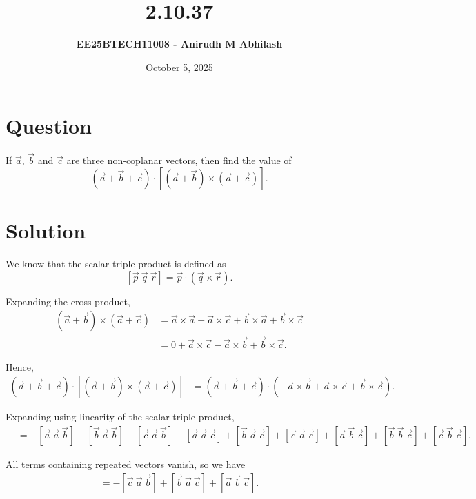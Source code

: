 \documentclass[12pt]{article}
\title{\textbf{2.10.37}}
\author{\textbf{EE25BTECH11008 - Anirudh M Abhilash}}
\date{October 5, 2025}
\begin{document}
\maketitle

\section*{Question}

If $\vec{a}$, $\vec{b}$ and $\vec{c}$ are three non-coplanar vectors, then find the value of  
\[
(\vec{a} + \vec{b} + \vec{c}) \cdot [(\vec{a} + \vec{b}) \times (\vec{a} + \vec{c})].
\]

\section*{Solution}

We know that the scalar triple product is defined as  
\[
[\vec{p}\ \vec{q}\ \vec{r}] = \vec{p} \cdot (\vec{q} \times \vec{r}).
\]

Expanding the cross product,
\begin{align}
(\vec{a} + \vec{b}) \times (\vec{a} + \vec{c})
&= \vec{a} \times \vec{a} + \vec{a} \times \vec{c} + \vec{b} \times \vec{a} + \vec{b} \times \vec{c} \\[4pt]
&= 0 + \vec{a} \times \vec{c} - \vec{a} \times \vec{b} + \vec{b} \times \vec{c}.
\end{align}

Hence,
\begin{align}
(\vec{a} + \vec{b} + \vec{c}) \cdot [(\vec{a} + \vec{b}) \times (\vec{a} + \vec{c})]
&= (\vec{a} + \vec{b} + \vec{c}) \cdot \left(-\vec{a} \times \vec{b} + \vec{a} \times \vec{c} + \vec{b} \times \vec{c}\right).
\end{align}

Expanding using linearity of the scalar triple product,
\begin{align}
&= -[\vec{a}\ \vec{a}\ \vec{b}] - [\vec{b}\ \vec{a}\ \vec{b}] - [\vec{c}\ \vec{a}\ \vec{b}]
+ [\vec{a}\ \vec{a}\ \vec{c}] + [\vec{b}\ \vec{a}\ \vec{c}] + [\vec{c}\ \vec{a}\ \vec{c}]
+ [\vec{a}\ \vec{b}\ \vec{c}] + [\vec{b}\ \vec{b}\ \vec{c}] + [\vec{c}\ \vec{b}\ \vec{c}].
\end{align}

All terms containing repeated vectors vanish, so we have
\begin{align}
= -[\vec{c}\ \vec{a}\ \vec{b}] + [\vec{b}\ \vec{a}\ \vec{c}] + [\vec{a}\ \vec{b}\ \vec{c}].
\end{align}
\end{document}
